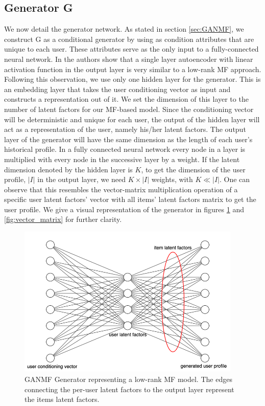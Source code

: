 \subsection{Generator G}
\label{sec:GANMF_G}
We now detail the generator network. As stated in section \ref{sec:GANMF}, we construct G as a conditional generator by using as condition attributes that are unique to each user. These attributes serve as the only input to a fully-connected neural network. In \cite{strub2016hybrid} the authors show that a single layer autoencoder with linear activation function in the output layer is very similar to a low-rank MF approach. Following this observation, we use only one hidden layer for the generator. This is an embedding layer that takes the user conditioning vector as input and constructs a representation out of it. We set the dimension of this layer to the number of latent factors for our MF-based model. Since the conditioning vector will be deterministic and unique for each user, the output of the hidden layer will act as a representation of the user, namely his/her latent factors. The output layer of the generator will have the same dimension as the length of each user's historical profile. In a fully connected neural network every node in a layer is multiplied with every node in the successive layer by a weight. If the latent dimension denoted by the hidden layer is $K$, to get the dimension of the user profile, $|I|$ in the output layer, we need $K\times|I|$ weights, with $K\ll|I|$. One can observe that this resembles the vector-matrix multiplication operation of a specific user latent factors' vector with all items' latent factors matrix to get the user profile. We give a visual representation of the generator in figures \ref{fig:generator_MF} and \ref{fig:vector_matrix} for further clarity.

\begin{figure}[h!]
    \centering
    \includegraphics[width=0.95\textwidth]{model/fully_connected_generator.png}
    \caption{GANMF Generator representing a low-rank MF model. The edges connecting the per-user latent factors to the output layer represent the items latent factors.}
    \label{fig:generator_MF}
\end{figure}

